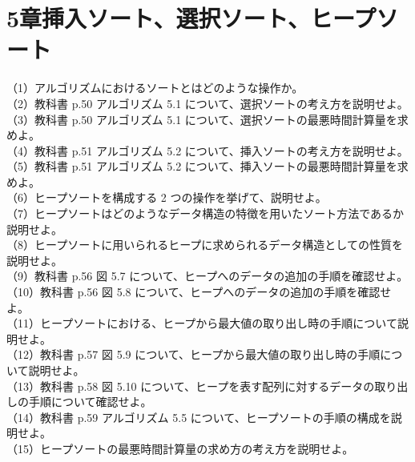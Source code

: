 \documentclass[dvipdfmx]{jreport}
\begin{document}
\section*{5章挿入ソート、選択ソート、ヒープソート}
（1）アルゴリズムにおけるソートとはどのような操作か。\\
（2）教科書 p.50 アルゴリズム 5.1 について、選択ソートの考え方を説明せよ。\\
（3）教科書 p.50 アルゴリズム 5.1 について、選択ソートの最悪時間計算量を求めよ。\\
（4）教科書 p.51 アルゴリズム 5.2 について、挿入ソートの考え方を説明せよ。\\
（5）教科書 p.51 アルゴリズム 5.2 について、挿入ソートの最悪時間計算量を求めよ。\\
（6）ヒープソートを構成する 2 つの操作を挙げて、説明せよ。\\
（7）ヒープソートはどのようなデータ構造の特徴を用いたソート方法であるか説明せよ。\\
（8）ヒープソートに用いられるヒープに求められるデータ構造としての性質を説明せよ。\\
（9）教科書 p.56 図 5.7 について、ヒープへのデータの追加の手順を確認せよ。\\
（10）教科書 p.56 図 5.8 について、ヒープへのデータの追加の手順を確認せよ。\\
（11）ヒープソートにおける、ヒープから最大値の取り出し時の手順について説明せよ。\\
（12）教科書 p.57 図 5.9 について、ヒープから最大値の取り出し時の手順について説明せよ。\\
（13）教科書 p.58 図 5.10 について、ヒープを表す配列に対するデータの取り出しの手順について確認せよ。\\
（14）教科書 p.59 アルゴリズム 5.5 について、ヒープソートの手順の構成を説明せよ。\\
（15）ヒープソートの最悪時間計算量の求め方の考え方を説明せよ。
\end{document}
